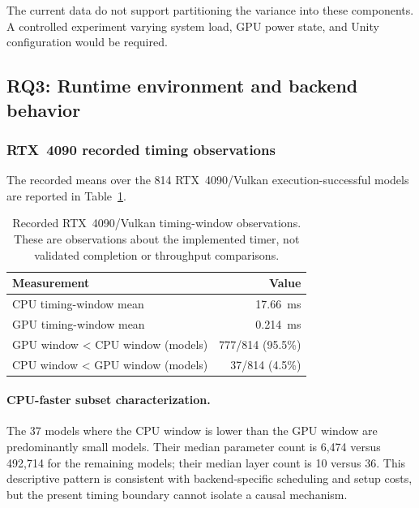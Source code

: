 \documentclass[10pt,twocolumn]{article}
\begin{document}
The current data do not support partitioning the variance into these components. A controlled experiment varying system load, GPU power state, and Unity configuration would be required.

\subsection{RQ3: Runtime environment and backend behavior}\label{sec:rq3}

\subsubsection{RTX~4090 recorded timing observations}

The recorded means over the 814 RTX~4090/Vulkan execution-successful models are reported in Table~\ref{tab:runtime}.

\begin{table}[t]
\centering\small
\begin{tabular}{lr}
\toprule
Measurement & Value \\
\midrule
CPU timing-window mean & 17.66~ms \\
GPU timing-window mean & 0.214~ms \\
GPU window < CPU window (models) & 777/814 (95.5\%) \\
CPU window < GPU window (models) & 37/814 (4.5\%) \\
\bottomrule
\end{tabular}
\caption{Recorded RTX~4090/Vulkan timing-window observations. These are observations about the implemented timer, not validated completion or throughput comparisons.}
\label{tab:runtime}
\end{table}

\paragraph{CPU-faster subset characterization.}
The 37 models where the CPU window is lower than the GPU window are predominantly small models. Their median parameter count is 6,474 versus 492,714 for the remaining models; their median layer count is 10 versus 36. This descriptive pattern is consistent with backend-specific scheduling and setup costs, but the present timing boundary cannot isolate a causal mechanism.
\end{document}
